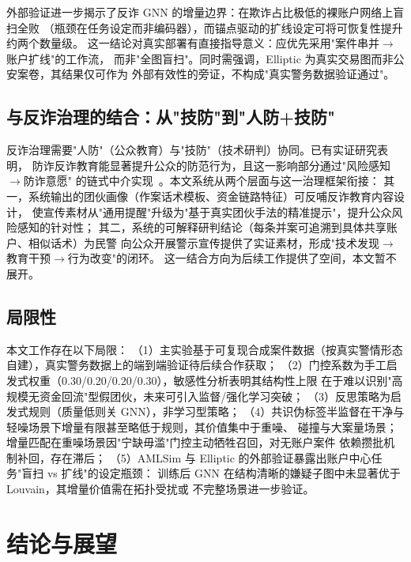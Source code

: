 \documentclass[12pt,a4paper,fontset=windows]{ctexart}
\begin{document}
外部验证进一步揭示了反诈 GNN 的增量边界：在欺诈占比极低的裸账户网络上盲扫全败
（瓶颈在任务设定而非编码器），而锚点驱动的扩线设定可将可恢复性提升约两个数量级。
这一结论对真实部署有直接指导意义：应优先采用"案件串并$\to$账户扩线"的工作流，
而非"全图盲扫"。同时需强调，Elliptic 为真实交易图而非公安案卷，其结果仅可作为
外部有效性的旁证，不构成"真实警务数据验证通过"。

\subsection{与反诈治理的结合：从"技防"到"人防+技防"}

反诈治理需要"人防"（公众教育）与"技防"（技术研判）协同。已有实证研究表明，
防诈反诈教育能显著提升公众的防范行为，且这一影响部分通过"风险感知$\to$防诈意愿"
的链式中介实现~\cite{jiang2025antifraud}。本文系统从两个层面与这一治理框架衔接：
其一，系统输出的团伙画像（作案话术模板、资金链路特征）可反哺反诈教育内容设计，
使宣传素材从"通用提醒"升级为"基于真实团伙手法的精准提示"，提升公众风险感知的针对性；
其二，系统的可解释研判结论（每条并案可追溯到具体共享账户、相似话术）为民警
向公众开展警示宣传提供了实证素材，形成"技术发现$\to$教育干预$\to$行为改变"的闭环。
这一结合方向为后续工作提供了空间，本文暂不展开。

\subsection{局限性}

本文工作存在以下局限：
（1）主实验基于可复现合成案件数据（按真实警情形态自建），真实警务数据上的端到端验证待后续合作获取；
（2）门控系数为手工启发式权重（0.30/0.20/0.20/0.30），敏感性分析表明其结构性上限
在于难以识别"高规模无资金回流"型假团伙，未来可引入监督/强化学习突破；
（3）反思策略为启发式规则（质量低则关 GNN），非学习型策略；
（4）共识伪标签半监督在干净与轻噪场景下增量有限甚至略低于规则，其价值集中于重噪、
碰撞与大案量场景；增量匹配在重噪场景因"宁缺毋滥"门控主动牺牲召回，对无账户案件
依赖攒批机制补回，存在滞后；
（5）AMLSim 与 Elliptic 的外部验证暴露出账户中心任务"盲扫 vs 扩线"的设定瓶颈：
训练后 GNN 在结构清晰的嫌疑子图中未显著优于 Louvain，其增量价值需在拓扑受扰或
不完整场景进一步验证。

\section{结论与展望}
\end{document}
